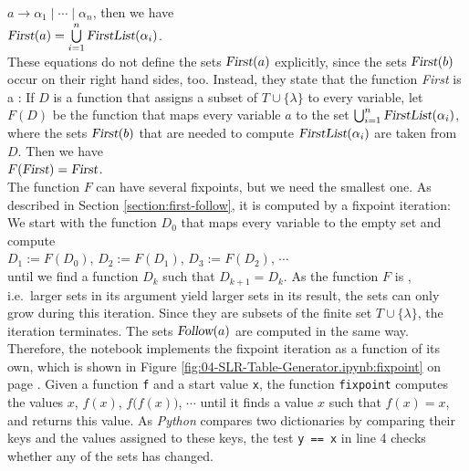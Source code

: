 $a \rightarrow \alpha_1 \mid \cdots \mid \alpha_n$, then we have
\\[0.2cm]
\hspace*{1.3cm}
$\textsl{First}(a) = \bigcup\limits_{i=1}^n \textsl{FirstList}(\alpha_i)$.
\\[0.2cm]
These equations do not define the sets $\textsl{First}(a)$ explicitly, since the sets $\textsl{First}(b)$ occur on
their right hand sides, too.  Instead, they state that the function \textsl{First} is a
:  If $D$ is a function that assigns a subset of $T \cup \{\lambda\}$ to every
variable, let $F(D)$ be the function that maps every variable $a$ to the set
$\bigcup_{i=1}^n \textsl{FirstList}(\alpha_i)$, where the sets $\textsl{First}(b)$ that are needed to compute
$\textsl{FirstList}(\alpha_i)$ are taken from $D$.  Then we have
\\[0.2cm]
\hspace*{1.3cm}
$F(\textsl{First}) = \textsl{First}$.
\\[0.2cm]
The function $F$ can have several fixpoints, but we need the smallest one.  As described in Section
\ref{section:first-follow}, it is computed by a fixpoint iteration:  We start with the function $D_0$ that maps every
variable to the empty set and compute
\\[0.2cm]
\hspace*{1.3cm}
$D_1 := F(D_0)$, \quad $D_2 := F(D_1)$, \quad $D_3 := F(D_2)$, \quad $\cdots$
\\[0.2cm]
until we find a function $D_k$ such that $D_{k+1} = D_k$.  As the function $F$ is
, i.e.~larger sets in its argument yield larger sets in its result, the sets can only
grow during this iteration.  Since they are subsets of the finite set $T \cup \{\lambda\}$, the iteration
terminates.  The sets $\textsl{Follow}(a)$ are computed in the same way.  Therefore, the notebook implements the
fixpoint iteration as a function of its own, which is shown in Figure \ref{fig:04-SLR-Table-Generator.ipynb:fixpoint}
on page \pageref{fig:04-SLR-Table-Generator.ipynb:fixpoint}.  Given a function \texttt{f} and a start value
\texttt{x}, the function \texttt{fixpoint} computes the values $x$, $f(x)$, $f\bigl(f(x)\bigr)$, $\cdots$ until it
finds a value $x$ such that $f(x) = x$, and returns this value.  As \textsl{Python} compares two dictionaries by
comparing their keys and the values assigned to these keys, the test \texttt{y == x} in line 4 checks whether any of
the sets has changed.

